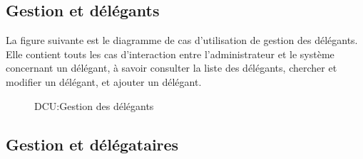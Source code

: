 \documentclass[a4paper]{report}
\begin{document}
\begin{doublespace}
	\subsection{Gestion et délégants}

	La figure suivante est le diagramme de cas d’utilisation de gestion des délégants.
	Elle contient touts les cas d'interaction entre l'administrateur et le système concernant un délégant,
	à savoir consulter la liste des délégants, chercher et modifier un délégant, et ajouter un délégant.
	\begin{figure}[H]
		\begin{center}
			\caption{DCU:Gestion des délégants}
		\end{center}
	\end{figure}

	\subsection{Gestion et délégataires}


\end{doublespace}
\end{document}
